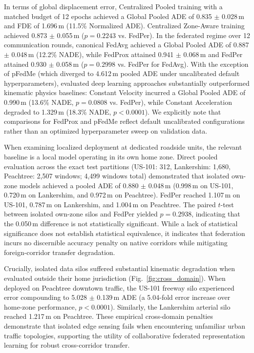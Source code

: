 \documentclass[journal]{IEEEtran}
\begin{document}
In terms of global displacement error, Centralized Pooled training with a matched budget of 12 epochs achieved a Global Pooled ADE of 0.835 $\pm$ 0.028\,m and FDE of 1.696\,m (11.5\% Normalized ADE). Centralized Zone-Aware training achieved 0.873 $\pm$ 0.055\,m ($p=0.2243$ vs. FedPer). In the federated regime over 12 communication rounds, canonical FedAvg achieved a Global Pooled ADE of 0.887 $\pm$ 0.048\,m (12.2\% NADE), while FedProx attained 0.941 $\pm$ 0.068\,m and FedPer attained 0.930 $\pm$ 0.058\,m ($p=0.2998$ vs. FedPer for FedAvg). With the exception of pFedMe (which diverged to 4.612\,m pooled ADE under uncalibrated default hyperparameters), evaluated deep learning approaches substantially outperformed kinematic physics baselines: Constant Velocity incurred a Global Pooled ADE of 0.990\,m (13.6\% NADE, $p=0.0808$ vs. FedPer), while Constant Acceleration degraded to 1.329\,m (18.3\% NADE, $p < 0.0001$). We explicitly note that comparisons for FedProx and pFedMe reflect default uncalibrated configurations rather than an optimized hyperparameter sweep on validation data.

When examining localized deployment at dedicated roadside units, the relevant baseline is a local model operating in its own home zone. Direct pooled evaluation across the exact test partitions (US-101: 312, Lankershim: 1,680, Peachtree: 2,507 windows; 4,499 windows total) demonstrated that isolated own-zone models achieved a pooled ADE of 0.880 $\pm$ 0.048\,m (0.998\,m on US-101, 0.720\,m on Lankershim, and 0.972\,m on Peachtree). FedPer reached 1.107\,m on US-101, 0.787\,m on Lankershim, and 1.004\,m on Peachtree. The paired $t$-test between isolated own-zone silos and FedPer yielded $p=0.2938$, indicating that the 0.050\,m difference is not statistically significant. While a lack of statistical significance does not establish statistical equivalence, it indicates that federation incurs no discernible accuracy penalty on native corridors while mitigating foreign-corridor transfer degradation.

Crucially, isolated data silos suffered substantial kinematic degradation when evaluated outside their home jurisdiction (Fig.~\ref{fig:cross_domain}). When deployed on Peachtree downtown traffic, the US-101 freeway silo experienced error compounding to 5.028 $\pm$ 0.139\,m ADE (a 5.04-fold error increase over home-zone performance, $p < 0.0001$). Similarly, the Lankershim arterial silo reached 1.217\,m on Peachtree. These empirical cross-domain penalties demonstrate that isolated edge sensing fails when encountering unfamiliar urban traffic topologies, supporting the utility of collaborative federated representation learning for robust cross-corridor transfer.
\end{document}
